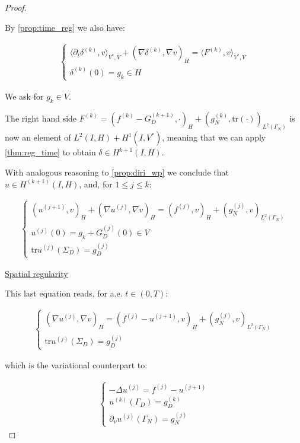 \documentclass[english,a4paper,9pt,oneside]{scrbook}	%
\theoremstyle{break}
\newenvironment{mproof}[1][\proofname]{%
  \begin{proof}[#1]$ $\par\nobreak\ignorespaces
}{%
  \end{proof}
}
\renewcommand*{\proofname}{Proof}
\theoremstyle{remark}
\newcommand{\tr}{\text{tr}}
\begin{document}
\begin{appendices}
\begin{mproof}
By \cref{prop:time_reg} we also have:

\begin{align*}
\left\{\begin{matrix}
\langle \partial_t \delta^{(k)},v\rangle_{V^*,V} + (\nabla \delta^{(k)}, \nabla v)_H = \langle F^{(k)}, v\rangle_{V^*,V} \\
\delta^{(k)}(0) = g_k \in H
\end{matrix}\right.
\end{align*}

We ask for $g_k \in V$.

The right hand side $F^{(k)} = (f^{(k)} - G^{(k+1)}_D, \cdot)_H +(g_N^{(k)}, \tr(\cdot))_{L^2(\Gamma_N)}$ is now an element of $L^2(I,H) + H^1(I,V^*)$, meaning that we can apply \cref{thm:reg_time} to obtain $\delta \in H^{k+1}(I,H)$. 

With analogous reasoning to \cref{prop:diri_wp} we conclude that $u \in H^{(k+1)}(I,H)$, and, for $1\leq j \leq k$:

\begin{align*}
	\left\{\begin{matrix}
(u^{(j+1)},v)_H + (\nabla u^{(j)}, \nabla v)_H = ( f^{(j)}, v)_H + (g_N^{(j)}, v)_{L^2(\Gamma_N)} \\
u^{(j)}(0) = g_k + G_D^{(j)}(0)  \in V \\
\tr u^{(j)}(\Sigma_D) = g_D^{(j)}
\end{matrix}\right.
\end{align*}

\underline{Spatial regularity}

This last equation reads, for a.e. $t \in (0,T)$:

\begin{align*}
\left\{\begin{matrix}
(\nabla u^{(j)}, \nabla v)_H = ( f^{(j)} - u^{(j+1)}, v)_H + (g_N^{(j)}, v)_{L^2(\Gamma_N)} \\
\tr u^{(j)}(\Sigma_D) = g_D^{(j)}
\end{matrix}\right.
\end{align*}

which is the variational counterpart to:

\begin{align*}
\left\{\begin{matrix}
- \Delta  u^{(j)} = f^{(j)} - u^{(j+1)} \\
u^{(k)}(\Gamma_D) = g_D^{(k)} \\
\partial_\nu u^{(j)}(\Gamma_N) = g_N^{(j)}
\end{matrix}\right.
\end{align*}


\end{mproof}
\end{appendices}
\end{document}
